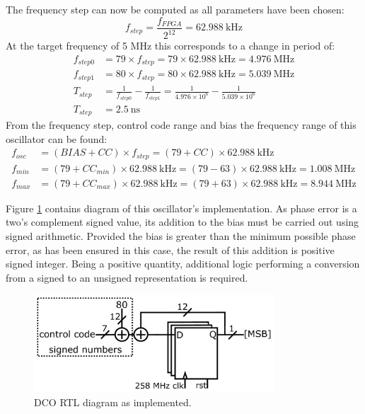 The frequency step can now be computed as all parameters have been chosen:
\begin{equation}
f_{step} = \frac{f_{FPGA}}{2^{12}} = 62.988~\si{\kilo\hertz}
\end{equation}
At the target frequency of 5 MHz this corresponds to a change in period of:
\begin{align}
f_{step0} &= 79 \times f_{step} = 79 \times 62.988~\si{\kilo\hertz} = 4.976~\si{\mega\hertz} \\
f_{step1} &= 80 \times f_{step} = 80 \times 62.988~\si{\kilo\hertz} = 5.039~\si{\mega\hertz} \\
T_{step}  &= \frac{1}{f_{step0}} - \frac{1}{f_{step1}} = \frac{1}{4.976\times 10^6} - \frac{1}{5.039\times 10^6} \\
T_{step}  &= 2.5~\si{\nano\second}
\end{align}
From the frequency step, control code range and bias the frequency range of this oscillator can be found:
\begin{align}
f_{osc} &= (BIAS+CC)\times f_{step} = (79+CC)\times 62.988~\si{\kilo\hertz}\\
f_{min} &= (79+CC_{min})\times 62.988~\si{\kilo\hertz} = (79-63)\times 62.988~\si{\kilo\hertz} = 1.008~\si{\mega\hertz}\\
f_{max} &= (79+CC_{max})\times 62.988~\si{\kilo\hertz} = (79+63)\times 62.988~\si{\kilo\hertz} = 8.944~\si{\mega\hertz}
\end{align}

Figure \ref{fig:osc2_impl} contains  diagram of this oscillator's implementation. As phase error is a two's complement signed value, its addition to the bias must be carried out using signed arithmetic. Provided the bias is greater than the minimum possible phase error, as has been ensured in this case, the result of this addition is positive signed integer. Being a positive quantity, additional logic performing a conversion from a signed to an unsigned representation is required.
\begin{figure}[h]%
    \centering
    \includegraphics[width=0.8\textwidth]{../osc2_impl} 
    \caption[\ac{DCO} \ac{RTL} diagram as implemented]{\ac{DCO} \ac{RTL} diagram as implemented.}
    \label{fig:osc2_impl}
\end{figure}

